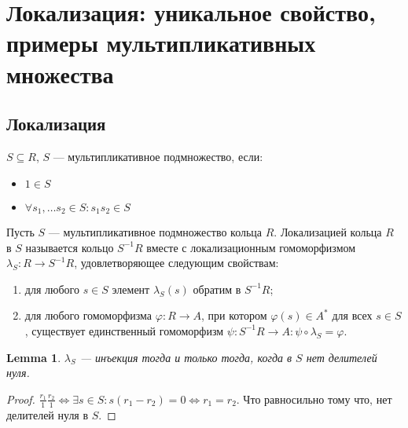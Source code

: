 \documentclass[11pt]{book}
\theoremstyle{definition}
\theoremstyle{plain}
\theoremstyle{plain}
\newtheorem{lm}{Lemma}
\theoremstyle{definition}
\theoremstyle{remark}
\begin{document}
\section{Локализация: уникальное свойство, примеры мультипликативных множества}
\subsection{Локализация}
%
\begin{defn}
    $ S \subseteq R$, $ S$ --- мультипликативное подмножество, если:
    \begin{itemize}
	\item $ 1 \in  S$ 
	    \item  $\forall s_1, \ldots  s_2 \in  S: s_1 s_2 \in S$
    \end{itemize}
\end{defn}
\begin{defn}
    Пусть $ S$ --- мультипликативное подмножество кольца  $ R$. {\sf Локализацией кольца}  $ R$ в  $ S$ называется кольцо  $ S^{-1}R$ вместе с локализационным гомоморфизмом $ \lambda_S : R \to  S^{-1}R$, удовлетворяющее следующим свойствам:
    \begin{enumerate}[noitemsep,label={\rm (\arabic*)}]
	\item для любого $ s \in S  $ элемент $ \lambda_S(s) $ обратим в  $ S^{-1}R$;
	\item для любого гомоморфизма $ \varphi : R \to  A$, при котором $ \varphi (s) \in A^{*}$ для всех  $ s \in S$, существует единственный гомоморфизм $ \psi : S^{-1}R \to  A: \psi \circ \lambda_S = \varphi $.
    \end{enumerate}
\end{defn}
 \begin{lm}
     $ \lambda_S $ --- инъекция тогда и только тогда, когда  в $ S$ нет делителей нуля.
 \end{lm}
 \begin{proof}
     $ \frac{r_1}{1} \frac{r_2}{ 1} \Leftrightarrow  \exists  s \in  S : s (r_1 - r_2) = 0 \Leftrightarrow r_1 = r_2$.  Что равносильно тому что, нет делителей нуля в $ S$.
 \end{proof}
\end{document}

